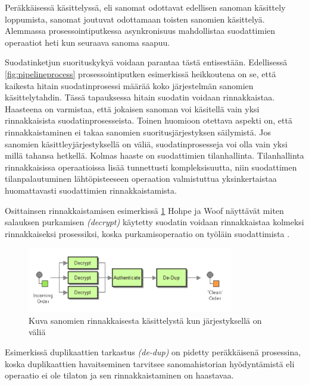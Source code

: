 \begin{itemize}
      Peräkkäisessä käsittelyssä, eli sanomat odottavat edellisen sanoman käsittely loppumista, sanomat joutuvat odottamaan toisten sanomien käsittelyä. Alemmassa prosessointiputkessa asynkronisuus mahdollistaa suodattimien operaatiot heti kun seuraava sanoma saapuu.
      
      Suodatinketjun suorituskykyä voidaan parantaa tästä entisestään. Edellisessä \ref{fig:pipelineprocess} prosessointiputken esimerkissä heikkoutena on se, että kaikesta hitain suodatinprosessi määrää koko järjestelmän sanomien käsittelytahdin. 
      Tässä tapauksessa hitain suodatin voidaan rinnakkaistaa. Haasteena on varmistaa, että jokaisen sanoman voi käsitellä vain yksi rinnakkaisista suodatinprosesseista. 
      Toinen huomioon otettava aspekti on, että rinnakkaistaminen ei takaa sanomien suoritusjärjestyksen säilymistä. Jos sanomien käsittleyjärjestyksellä on väliä, suodatinprosesseja voi olla vain yksi millä tahansa hetkellä. 
      Kolmas haaste on suodattimien tilanhallinta. Tilanhallinta rinnakkaisissa operaatioissa lisää tunnettusti kompleksisuutta, niin suodattimen tilanpalautuminen lähtöpisteeseen operaation valmistuttua yksinkertaistaa huomattavasti suodattimien rinnakkaistamista.

      Osittainsen rinnakkaistamisen  esimerkissä \ref{fig:parallelprocess} Hohpe ja Woof näyttävät miten salauksen purkamisen \textit{(decrypt)} käytetty suodatin voidaan rinnakkaistaa kolmeksi rinnakkaiseksi prosessiksi, koska purkamisoperaatio on työläin suodattimista \citep{Hohpe2004}.
      \begin{figure}[!h]
      \begin{center}
      \includegraphics[width=0.8\textwidth]{kuvat/paraller_processing.png}
      \caption{Kuva sanomien rinnakkaisesta käsittelystä kun järjestyksellä on väliä \citep{Hohpe2004}\label{fig:parallelprocess}}
      \end{center}
      \end{figure}
      Esimerkissä duplikaattien tarkastus \textit{(de-dup)} on pidetty peräkkäisenä prosessina, koska duplikaattien havaitseminen tarvitsee sanomahistorian hyödyntämistä eli operaatio ei ole tilaton ja sen rinnakkaistaminen on haastavaa. 


\end{itemize}
